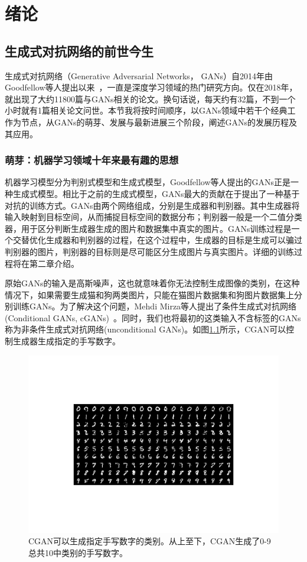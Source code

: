 \chapter{绪论}

\section{生成式对抗网络的前世今生}

生成式对抗网络（Generative Adversarial Networks， GANs）自2014年由Goodfellow等人提出以来~\cite{GANs}，一直是深度学习领域的热门研究方向。仅在2018年，就出现了大约11800篇与GANs相关的论文。换句话说，每天约有32篇，不到一个小时就有1篇相关论文问世\cite{review}。本节我将按时间顺序，以GANs领域中若干个经典工作为节点，从GANs的萌芽、发展与最新进展三个阶段，阐述GANs的发展历程及其应用。

\subsection{萌芽：机器学习领域十年来最有趣的思想}
机器学习模型分为判别式模型和生成式模型，Goodfellow等人提出的GANs正是一种生成式模型。相比于之前的生成式模型，GANs最大的贡献在于提出了一种基于对抗的训练方式。GANs由两个网络组成，分别是生成器和判别器。其中生成器将输入映射到目标空间，从而捕捉目标空间的数据分布；判别器一般是一个二值分类器，用于区分判断生成器生成的图片和数据集中真实的图片。GANs训练过程是一个交替优化生成器和判别器的过程，在这个过程中，生成器的目标是生成可以骗过判别器的图片，判别器的目标则是尽可能区分生成图片与真实图片。详细的训练过程将在第二章介绍。

原始GANs的输入是高斯噪声，这也就意味着你无法控制生成图像的类别，在这种情况下，如果需要生成猫和狗两类图片，只能在猫图片数据集和狗图片数据集上分别训练GANs。为了解决这个问题，Mehdi Mirza等人提出了条件生成式对抗网络(Conditional GANs, cGANs)~\cite{CGANs}。同时，我们也将最初的这类输入不含标签的GANs称为非条件生成式对抗网络(unconditional GANs)。如图\ref{CGAN-result}所示，CGAN可以控制生成器生成指定的手写数字。

\begin{figure}
    \centering
    \includegraphics[width=\textwidth]{figures/CGAN-result.pdf}
    \caption{CGAN可以生成指定手写数字的类别。从上至下，CGAN生成了0-9总共10中类别的手写数字。}
    \label{CGAN-result}
\end{figure}

